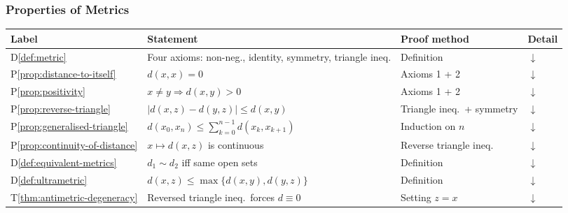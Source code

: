\subsubsection{Properties of Metrics}
\label{sec:properties-of-metrics}

\begin{tcolorbox}[colback=gray!6, colframe=gray!40, arc=2pt,
  left=6pt, right=6pt, top=4pt, bottom=4pt,
  title={\small\textbf{Properties of Metrics --- Quick Reference}},
  fonttitle=\small\bfseries]
\small
\begin{tabular}{l l l l}
\toprule
\textbf{Label} & \textbf{Statement} & \textbf{Proof method} & \textbf{Detail} \\
\midrule
D\ref{def:metric}
  & Four axioms: non-neg., identity, symmetry, triangle ineq.
  & Definition
  & \hyperref[def:metric]{$\downarrow$} \\
P\ref{prop:distance-to-itself}
  & $d(x,x) = 0$
  & Axioms 1 + 2
  & \hyperref[prop:distance-to-itself]{$\downarrow$} \\
P\ref{prop:positivity}
  & $x \neq y \Rightarrow d(x,y) > 0$
  & Axioms 1 + 2
  & \hyperref[prop:positivity]{$\downarrow$} \\
P\ref{prop:reverse-triangle}
  & $|d(x,z) - d(y,z)| \le d(x,y)$
  & Triangle ineq.\ + symmetry
  & \hyperref[prop:reverse-triangle]{$\downarrow$} \\
P\ref{prop:generalised-triangle}
  & $d(x_0,x_n) \le \sum_{k=0}^{n-1} d(x_k,x_{k+1})$
  & Induction on $n$
  & \hyperref[prop:generalised-triangle]{$\downarrow$} \\
P\ref{prop:continuity-of-distance}
  & $x \mapsto d(x,z)$ is continuous
  & Reverse triangle ineq.
  & \hyperref[prop:continuity-of-distance]{$\downarrow$} \\
D\ref{def:equivalent-metrics}
  & $d_1 \sim d_2$ iff same open sets
  & Definition
  & \hyperref[def:equivalent-metrics]{$\downarrow$} \\
D\ref{def:ultrametric}
  & $d(x,z) \le \max\{d(x,y),d(y,z)\}$
  & Definition
  & \hyperref[def:ultrametric]{$\downarrow$} \\
T\ref{thm:antimetric-degeneracy}
  & Reversed triangle ineq.\ forces $d \equiv 0$
  & Setting $z=x$
  & \hyperref[thm:antimetric-degeneracy]{$\downarrow$} \\
\bottomrule
\end{tabular}
\end{tcolorbox}

